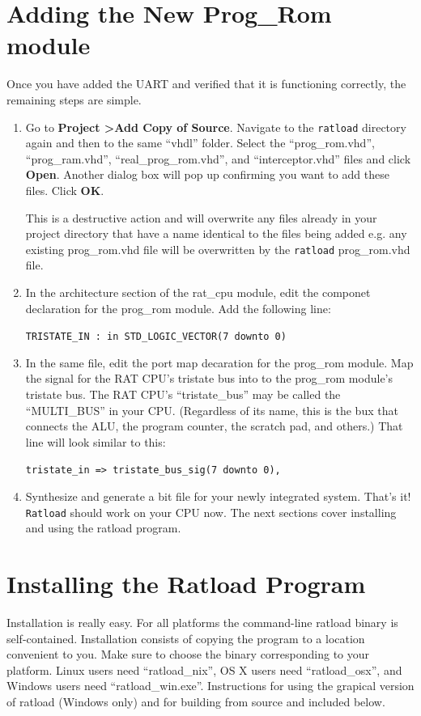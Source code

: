 \documentclass[notitlepage]{article}
\newcommand{\warningsign}{\fontencoding{U}\fontfamily{futs}\Large\selectfont\char 66\relax}
\begin{document}
\section{Adding the New Prog\_Rom module}
Once you have added the UART and verified that it is functioning correctly, the remaining steps are simple.
\begin{enumerate}
\item Go to \textbf{Project \textgreater Add Copy of Source}. Navigate to the \texttt{ratload} directory again and then to the same ``vhdl'' folder. Select the ``prog\_rom.vhd'', ``prog\_ram.vhd'', ``real\_prog\_rom.vhd'', and ``interceptor.vhd'' files and click \textbf{Open}. Another dialog box will pop up confirming you want to add these files. Click \textbf{OK}.

\begin{infobox}
  {\warningsign} This is a destructive action and will overwrite any files already in your project directory that have a name identical to the files being added e.g. any existing prog\_rom.vhd file will be overwritten by the \texttt{ratload} prog\_rom.vhd file.
\end{infobox}

\item In the architecture section of the rat\_cpu module, edit the componet declaration for the prog\_rom module. Add the following line:\\
\centerline{\texttt{TRISTATE\_IN : in STD\_LOGIC\_VECTOR(7 downto 0)}}

\item In the same file, edit the port map decaration for the prog\_rom module. Map the signal for the RAT CPU's tristate bus into to the prog\_rom module's tristate bus. The RAT CPU's ``tristate\_bus'' may be called the ``MULTI\_BUS'' in your CPU. (Regardless of its name, this is the bux that connects the ALU, the program counter, the scratch pad, and others.) That line will look similar to this:\\
  \centerline{\texttt{tristate\_in =\textgreater ~tristate\_bus\_sig(7 downto 0),}}

\item Synthesize and generate a bit file for your newly integrated system. That's it! \texttt{Ratload} should work on your CPU now. The next sections cover installing and using the ratload program.
\end{enumerate}

\section{Installing the Ratload Program}
Installation is really easy. For all platforms the command-line ratload binary is self-contained. Installation consists of copying the program to a location convenient to you. Make sure to choose the binary corresponding to your platform. Linux users need ``ratload\_nix'', OS X users need ``ratload\_osx'', and Windows users need ``ratload\_win.exe''. Instructions for using the grapical version of ratload (Windows only) and for building from source and included below.
\end{document}
